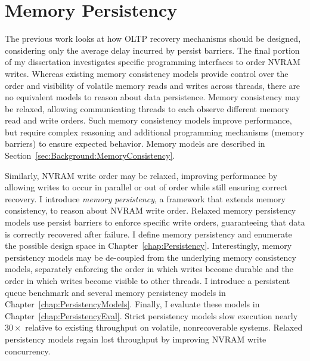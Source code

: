 \section{Memory Persistency}
\label{sec:Intro:PMC}

The previous work looks at how OLTP recovery mechanisms should be designed, considering only the average delay incurred by persist barriers.
The final portion of my dissertation investigates specific programming interfaces to order NVRAM writes.
Whereas existing memory consistency models provide control over the order and visibility of volatile memory reads and writes across threads, there are no equivalent models to reason about data persistence.
Memory consistency may be relaxed, allowing communicating threads to each observe different memory read and write orders.
Such memory consistency models improve performance, but require complex reasoning and additional programming mechanisms (memory barriers) to ensure expected behavior.
Memory models are described in Section~\ref{sec:Background:MemoryConsistency}.

Similarly, NVRAM write order may be relaxed, improving performance by allowing writes to occur in parallel or out of order while still ensuring correct recovery.
I introduce \emph{memory persistency}, a framework that extends memory consistency, to reason about NVRAM write order.
Relaxed memory persistency models use persist barriers to enforce specific write orders, guaranteeing that data is correctly recovered after failure.
I define memory persistency and enumerate the possible design space in Chapter~\ref{chap:Persistency}.
Interestingly, memory persistency models may be de-coupled from the underlying memory consistency models, separately enforcing the order in which writes become durable and the order in which writes become visible to other threads.
I introduce a persistent queue benchmark and several memory persistency models in Chapter~\ref{chap:PersistencyModels}.
Finally, I evaluate these models in Chapter~\ref{chap:PersistencyEval}.
Strict persistency models slow execution nearly $30\times$ relative to existing throughput on volatile, nonrecoverable systems.
Relaxed persistency models regain lost throughput by improving NVRAM write concurrency.

